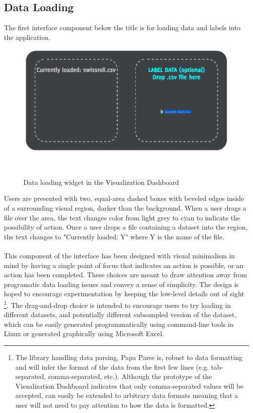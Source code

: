 \documentclass{sigchi}
\begin{document}
\subsection{Data Loading}
The first interface component below the title is for loading data and labels into the application. %
%
\begin{figure}
  \centering
  \includegraphics[width=.99\columnwidth]{figures/data_load}
  \caption{Data loading widget in the Visualization Dashboard}~\label{fig:figure2}
\end{figure}
%
Users are presented with two, equal-area dashed boxes with beveled edges inside of a surrounding visual region, darker than the background. %
%
When a user drags a file over the area, the text changes color from light grey to cyan to indicate the possibility of action. %
%
Once a user drops a file containing a dataset into the region, the text changes to "Currently loaded: Y" where Y is the name of the file. %
%
\\\\
%
This component of the interface has been designed with visual minimalism in mind by having a single point of focus that indicates an action is possible, or an action has been completed. %
%
These choices are meant to draw attention away from programatic data loading issues and convey a sense of simplicity. %
%
The design is hoped to encourage experimentation by keeping the low-level details out of sight%
%
\footnote{The library handling data parsing, Papa Parse \cite{papaparse} is, robust to data formatting and will infer the format of the data from the first few lines (e.g. tab-separated, comma-separated, etc.). %
%
Although the prototype of the Visualization Dashboard indicates that only comma-separated values will be accepted, \cite{papaparse} can easily be extended to arbitrary data formats meaning that a user will not need to pay attention to how the data is formatted.}. %
%
The drag-and-drop choice is intended to encourage users to try loading in different datasets, and potentially different subsampled version of the dataset, which can be easily generated programmatically using command-line tools in Linux or generated graphically using Microsoft Excel. %
%
%
\end{document}
